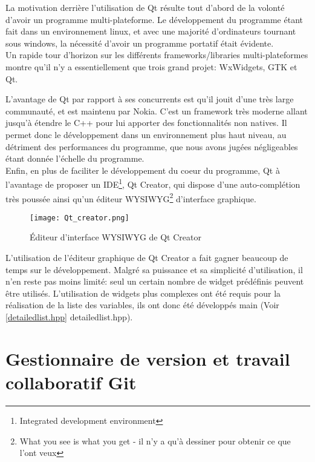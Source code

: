         La motivation derrière l'utilisation de Qt résulte tout d'abord de la volonté d'avoir un programme multi-plateforme. Le développement du programme étant fait dans un environnement linux, et avec une majorité d'ordinateurs tournant sous windows, la nécessité d'avoir un programme portatif était évidente.
        \\ Un rapide tour d'horizon sur les différents frameworks/libraries multi-plateformes montre qu'il n'y a essentiellement que trois grand projet: WxWidgets, GTK et Qt.

    \newpage
        
        L'avantage de Qt par rapport à ses concurrents est qu'il jouit d'une très large communauté, et est maintenu par Nokia. C'est un framework très moderne allant jusqu'à étendre le C++ pour lui apporter des fonctionnalités non natives. Il permet donc le développement dans un environnement plus haut niveau, au détriment des performances du programme, que nous avons jugées négligeables étant donnée l'échelle du programme.
        \\ Enfin, en plus de faciliter le développement du coeur du programme, Qt à l'avantage de proposer un IDE\footnote{Integrated development environment}, Qt Creator, qui dispose d'une auto-complétion très poussée ainsi qu'un éditeur WYSIWYG\footnote{What you see is what you get - il n'y a qu'à dessiner pour obtenir ce que l'ont veux} d'interface graphique.

        \begin{figure}[h]
            \begin{center}
                \texttt{[image: Qt\_creator.png]}
            \end{center}

            \caption{Éditeur d'interface WYSIWYG de Qt Creator}
            \label{Qt Creator}
        \end{figure}

        L'utilisation de l'éditeur graphique de Qt Creator a fait gagner beaucoup de temps sur le développement. Malgré sa puissance et sa simplicité d'utilisation, il n'en reste pas moins limité: seul un certain nombre de widget prédéfinis peuvent être utilisés. L'utilisation de widgets plus complexes ont été requis pour la réalisation de la liste des variables, ils ont donc été développés main (Voir \ref{detailedlist.hpp} detailedlist.hpp).

    \newpage

    \section{Gestionnaire de version et travail collaboratif Git}
